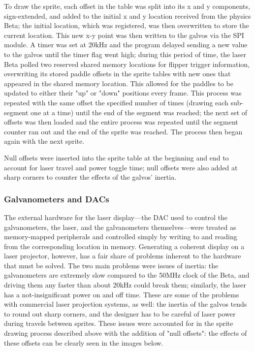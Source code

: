 \documentclass{article}
\begin{document}
 To draw the sprite, each offset in the table was split into its x and y components, sign-extended, and added to the initial x and y location received from the physics Beta; the initial location, which was registered, was then overwritten to store the current location. This new x-y point was then written to the galvos via the SPI module. A timer was set at 20kHz and the program delayed sending a new value to the galvos until the timer flag went high; during this period of time, the laser Beta polled two reserved shared memory locations for flipper trigger information, overwriting its stored paddle offsets in the sprite tables with new ones that appeared in the shared memory location. This allowed for the paddles to be updated to either their "up" or "down" positions every frame. This process was repeated with the same offset the specified number of times (drawing each sub-segment one at a time) until the end of the segment was reached; the next set of offsets was then loaded and the entire process was repeated until the segment counter ran out and the end of the sprite was reached. The process then began again with the next sprite.
 
Null offsets were inserted into the sprite table at the beginning and end to account for laser travel and power toggle time; null offsets were also added at sharp corners to counter the effects of the galvos' inertia.

\subsubsection{Galvanometers and DACs} \label{galvos}

The external hardware for the laser display—the DAC used to control the galvanometers, the laser, and the galvanometers themselves—were treated as memory-mapped peripherals and controlled simply by writing to and reading from the corresponding location in memory. Generating a coherent display on a laser projector, however, has a fair share of problems inherent to the hardware that must be solved. The two main problems were issues of inertia: the galvanometers are extremely slow compared to the 50MHz clock of the Beta, and driving them any faster than about 20kHz could break them; similarly, the laser has a not-insignificant power on and off time. These are some of the problems with commercial laser projection systems, as well: the inertia of the galvos tends to round out sharp corners, and the designer has to be careful of laser power during travels between sprites. These issues were accounted for in the sprite drawing process described above with the addition of "null offsets": the effects of these offsets can be clearly seen in the images below.
\end{document}
